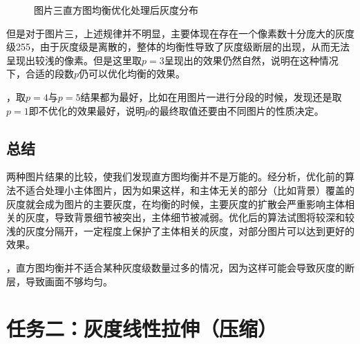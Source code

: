 \documentclass[UTF8]{ctexart}
\begin{document}
\begin{figure}[H]
				\caption{图片三直方图均衡优化处理后灰度分布}
			\end{figure}

			但是对于图片三，上述规律并不明显，主要体现在存在一个像素数十分庞大的灰度级255，由于灰度级是离散的，整体的均衡性导致了灰度级断层的出现，从而无法呈现出较浅的像素。但是这里取$p=3$呈现出的效果仍然自然，说明在这种情况下，合适的段数$p$仍可以优化均衡的效果。\newline

			
			，取$p=4$与$p=5$结果都为最好，比如在用图片一进行分段的时候，发现还是取$p=1$即不优化的效果最好，说明$p$的最终取值还要由不同图片的性质决定。

		\subsection{总结}
			两种图片结果的比较，使我们发现直方图均衡并不是万能的。经分析，优化前的算法不适合处理小主体图片，因为如果这样，和主体无关的部分（比如背景）覆盖的灰度就会成为图片的主要灰度，在均衡的时候，主要灰度的扩散会严重影响主体相关的灰度，导致背景细节被突出，主体细节被减弱。优化后的算法试图将较深和较浅的灰度分隔开，一定程度上保护了主体相关的灰度，对部分图片可以达到更好的效果。\newline

			，直方图均衡并不适合某种灰度级数量过多的情况，因为这样可能会导致灰度的断层，导致画面不够均匀。


	\section{任务二：灰度线性拉伸（压缩）}
\end{document}
